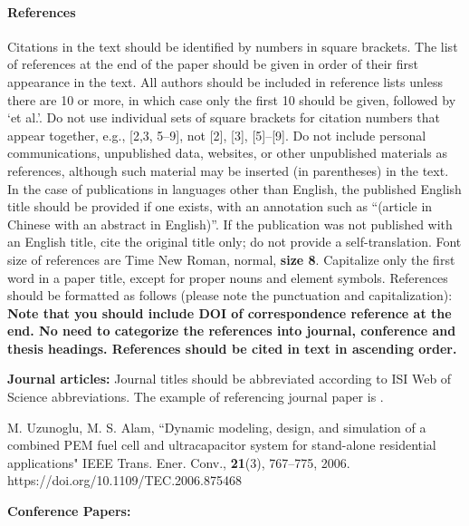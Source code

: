 \documentclass{article} %
\begin{document}
\begin{multicols}{2}
\paragraph{References}

Citations in the text should be identified by numbers in square brackets. The list of references at the end of the paper should be given in order of their first appearance in the text. All authors should be included in reference lists unless there are 10 or more, in which case only the first 10 should be given, followed by `et al.'. Do not use individual sets of square brackets for citation numbers that appear together, e.g., [2,3, 5--9], not [2], [3], [5]--[9]. Do not include personal communications, unpublished data, websites, or other unpublished materials as references, although such material may be inserted (in parentheses) in the text. In the case of publications in languages other than English, the published English title should be provided if one exists, with an annotation such as ``(article in Chinese with an abstract in English)''. If the publication was not published with an English title, cite the original title only; do not provide a self-translation. Font size of references are Time New Roman, normal, \textbf{size 8}. Capitalize only the first word in a paper title, except for proper nouns and element symbols. References should be formatted as follows (please note the punctuation and capitalization): \\

\textbf{Note that you should include DOI of correspondence reference at the end. No need to categorize the references into journal, conference and thesis headings. References should be cited in text in ascending order.}
\newline

\footnotesize{

\noindent \textbf{Journal articles:} Journal titles should be abbreviated according to ISI Web of Science abbreviations. The example of referencing journal paper is \cite{journal1}. 
\begin{thebibliography}{99}
	M. Uzunoglu, M. S. Alam, ``Dynamic modeling, design, and simulation of a combined PEM fuel cell and ultracapacitor system for stand-alone residential applications" IEEE Trans. Ener. Conv., \textbf{21}(3), 767--775, 2006. https://doi.org/10.1109/TEC.2006.875468


\hspace{-1cm} \textbf{Conference Papers:}


\end{thebibliography}}
\end{multicols}
\end{document}
